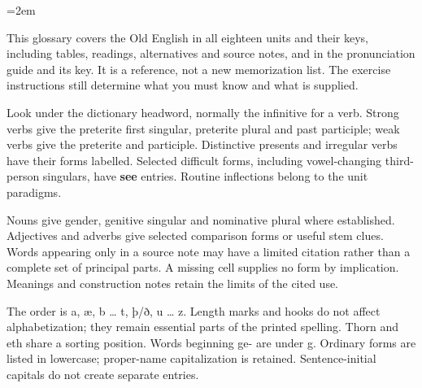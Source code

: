 \BookRecto
\begingroup
\renewcommand{\runningtitle}{Old English–English}
\raggedcolumns
\newcommand{\needspace}[1]{\par\begingroup\skip0=\lastskip\vskip-\skip0\dimen0=#1\relax\advance\dimen0 by\skip0\vskip0pt plus\dimen0\penalty-100\vskip0pt plus-\dimen0\vskip\dimen0\penalty9999\vskip-\dimen0\vskip\skip0\endgroup}
\setlength{\columnsep}{6mm}
\emergencystretch=2em

\raggedright
\fontsize{10.5}{13.2}\selectfont
This glossary covers the Old English in all eighteen units and their keys, including tables, readings, alternatives and source notes, and in the pronunciation guide and its key. It is a reference, not a new memorization list. The exercise instructions still determine what you must know and what is supplied.\par
Look under the dictionary headword, normally the infinitive for a verb. Strong verbs give the preterite first singular, preterite plural and past participle; weak verbs give the preterite and participle. Distinctive presents and irregular verbs have their forms labelled. Selected difficult forms, including vowel-changing third-person singulars, have \textbf{see} entries. Routine inflections belong to the unit paradigms.\par
Nouns give gender, genitive singular and nominative plural where established. Adjectives and adverbs give selected comparison forms or useful stem clues. Words appearing only in a source note may have a limited citation rather than a complete set of principal parts. A missing cell supplies no form by implication. Meanings and construction notes retain the limits of the cited use.\par
The order is a, æ, b … t, þ/ð, u … z. Length marks and hooks do not affect alphabetization; they remain essential parts of the printed spelling. Thorn and eth share a sorting position. Words beginning ge- are under g. Ordinary forms are listed in lowercase; proper-name capitalization is retained. Sentence-initial capitals do not create separate entries.\par
